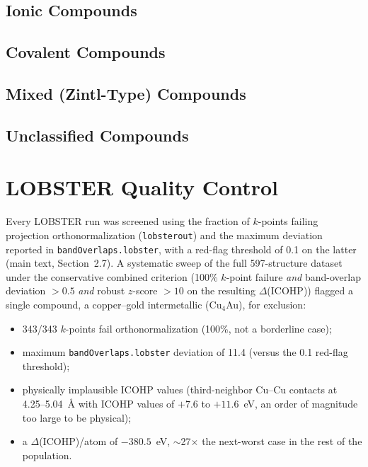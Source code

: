 \documentclass[11pt]{article}
\begin{document}
\subsection{Ionic Compounds}
\label{sec:si-master-ionic}
{\footnotesize

}

\subsection{Covalent Compounds}
\label{sec:si-master-covalent}
{\footnotesize

}

\subsection{Mixed (Zintl-Type) Compounds}
\label{sec:si-master-mixed}
{\footnotesize

}

\subsection{Unclassified Compounds}
\label{sec:si-master-unclassified}
{\footnotesize

}

\section{LOBSTER Quality Control}
\label{sec:si-qc}

Every LOBSTER run was screened using the fraction of $k$-points failing
projection orthonormalization (\texttt{lobsterout}) and the maximum
deviation reported in \texttt{bandOverlaps.lobster}, with a red-flag
threshold of 0.1 on the latter (main text, Section~2.7). A systematic sweep
of the full 597-structure dataset under the conservative combined criterion
(100\% $k$-point failure \emph{and} band-overlap deviation $>0.5$
\emph{and} robust $z$-score $>10$ on the resulting $\Delta$(ICOHP)) flagged
a single compound, a copper--gold intermetallic (Cu$_4$Au), for exclusion:

\begin{itemize}
  \item 343/343 $k$-points fail orthonormalization (100\%, not a borderline
  case);
  \item maximum \texttt{bandOverlaps.lobster} deviation of 11.4 (versus the
  0.1 red-flag threshold);
  \item physically implausible ICOHP values (third-neighbor Cu--Cu contacts
  at 4.25--5.04~\AA{} with ICOHP values of $+7.6$ to $+11.6$~eV, an order
  of magnitude too large to be physical);
  \item a $\Delta$(ICOHP)/atom of $-380.5$~eV, $\sim$27$\times$ the
  next-worst case in the rest of the population.
\end{itemize}
\end{document}
